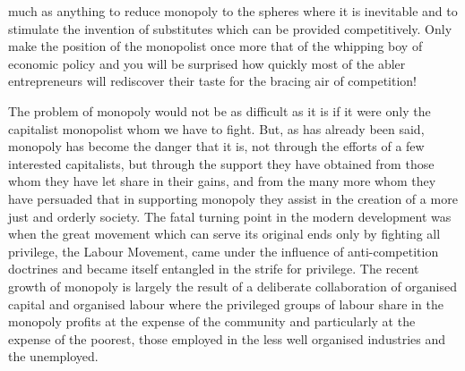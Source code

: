 \documentclass[11pt,openany]{book}
\begin{document}
much as anything to reduce monopoly to the spheres where it is inevitable and to stimulate the invention of substitutes which can be provided competitively. Only make the position of the monopolist once more that of the whipping boy of economic policy and you will be surprised how quickly most of the abler entrepreneurs will rediscover their taste for the bracing air of competition!

\begin{center}\textasteriskcentered\hspace{0.9em}\textasteriskcentered\hspace{0.9em}\textasteriskcentered\end{center}

\begin{center}\textasteriskcentered\hspace{0.9em}\textasteriskcentered\hspace{0.9em}\textasteriskcentered\end{center}

\begin{center}\textasteriskcentered\hspace{0.9em}\textasteriskcentered\hspace{0.9em}\textasteriskcentered\end{center}

\begin{center}\textasteriskcentered\hspace{0.9em}\textasteriskcentered\hspace{0.9em}\textasteriskcentered\end{center}

\begin{center}\textasteriskcentered\hspace{0.9em}\textasteriskcentered\hspace{0.9em}\textasteriskcentered\end{center}

The problem of monopoly would not be as difficult as it is if it were only the capitalist monopolist whom we have to fight. But, as has already been said, monopoly has become the danger that it is, not through the efforts of a few interested capitalists, but through the support they have obtained from those whom they have let share in their gains, and from the many more whom they have persuaded that in supporting monopoly they assist in the creation of a more just and orderly society. The fatal turning point in the modern development was when the great movement which can serve its original ends only by fighting all privilege, the Labour Movement, came under the influence of anti-competition doctrines and became itself entangled in the strife for privilege. The recent growth of monopoly is largely the result of a deliberate collaboration of organised capital and organised labour where the privileged groups of labour share in the monopoly profits at the expense of the community and particularly at the expense of the poorest, those employed in the less well organised industries and the unemployed.
\end{document}
